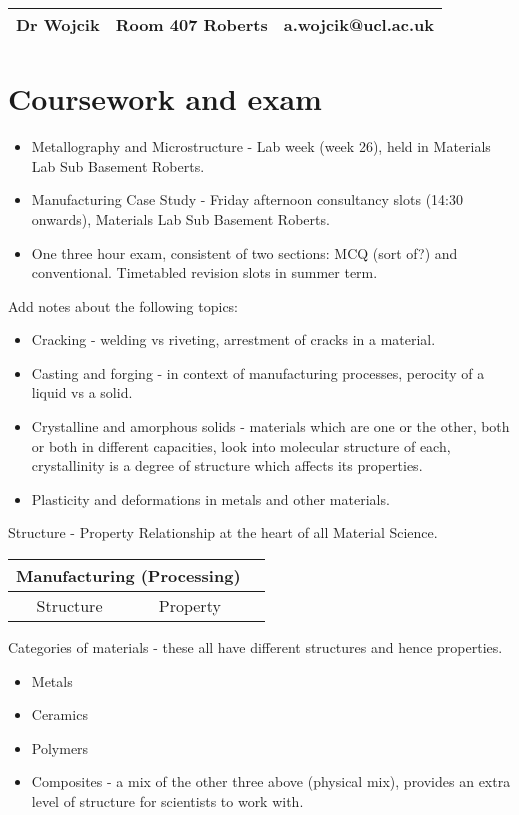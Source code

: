 \documentclass[class=report, crop=false, 12pt,a4paper]{standalone}
\begin{document}
\begin{center}
  \begin{tabular}{ |c|c|c| } 
   \hline
   Dr Wojcik & Room 407 Roberts & a.wojcik@ucl.ac.uk \\ 
   \hline
  \end{tabular}
  \end{center}

\section{Coursework and exam}
\begin{itemize}
  \item Metallography and Microstructure - Lab week (week 26), held in Materials Lab Sub Basement Roberts.
  \item Manufacturing Case Study - Friday afternoon consultancy slots (14:30 onwards), Materials Lab Sub Basement Roberts.
  \item One three hour exam, consistent of two sections: MCQ (sort of?) and conventional. Timetabled revision slots in summer term.
\end{itemize}

Add notes about the following topics: 
\begin{itemize}
  \item Cracking - welding vs riveting, arrestment of cracks in a material. 
  \item Casting and forging - in context of manufacturing processes, perocity of a liquid vs a solid.
  \item Crystalline and amorphous solids -  materials which are one or the other, both or both in different capacities, look into molecular structure of each, crystallinity is a degree of structure which affects its properties.
  \item Plasticity and deformations in metals and other materials.
\end{itemize}

Structure - Property Relationship at the heart of all Material Science.
\begin{center}
  \begin{tabular}{ |c|c|c| } 
   \hline
    \multicolumn{2}{|c|}{Manufacturing (Processing)} \\
    \hline
    Structure & Property \\
   \hline
  \end{tabular}
\end{center}

Categories of materials - these all have different structures and hence properties.
\begin{itemize}[noitemsep]
  \item Metals
  \item Ceramics
  \item Polymers
  \item Composites - a mix of the other three above (physical mix), provides an extra level of structure for scientists to work with.
\end{itemize}
\end{document}
